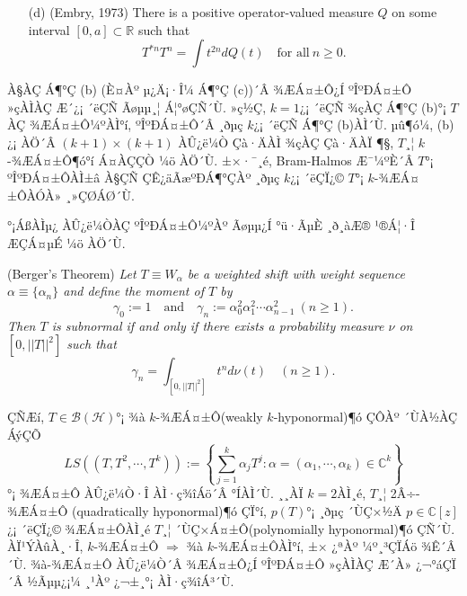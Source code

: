\documentclass[12pt,a4paper,2sided]{article}
\newcommand{\vs}{\vspace}
\begin{document}
\newpage

 \vspace{.4 cm}

{\sl \begin{itemize}
\item[\rm(d)] {\rm (Embry, 1973)}  There is a positive
operator-valued measure $Q$ on some interval $[0,a]\subset
\mathbb{R}$ such that
$$
T^{*n}T^n=\int t^{2n} dQ(t)\quad\text{for all}\ n\ge 0.
$$
\end{itemize}}

À§ÀÇ Á¶°Ç (b) (È¤Àº µ¿Ä¡·Î¼­ Á¶°Ç (c))´Â ¾ÆÁ¤±Ô¿Í ºÎºÐÁ¤±Ô »çÀÌÀÇ
Æ´¿¡ ´ëÇÑ Ãøµµ¸¦ Á¦°øÇÑ´Ù. »ç½Ç, $k=1$¿¡ ´ëÇÑ ¾çÀÇ Á¶°Ç (b)°¡ $T$ÀÇ
¾ÆÁ¤±Ô¼ºÀÌ°í, ºÎºÐÁ¤±Ô´Â ¸ðµç $k$¿¡ ´ëÇÑ Á¶°Ç (b)ÀÌ´Ù. µû¶ó¼­, (b)¿¡
ÀÖ´Â $(k+1)\times (k+1)$ ÀÛ¿ë¼Ò Çà·ÄÀÌ ¾çÀÇ Çà·ÄÀÏ ¶§, $T$¸¦
$k$-¾ÆÁ¤±Ô¶ó°í Á¤ÀÇÇÒ ¼ö ÀÖ´Ù. ±×·¯¸é, Bram-Halmos Æ¯¼ºÈ­´Â $T$°¡
ºÎºÐÁ¤±ÔÀÌ±â À§ÇÑ ÇÊ¿äÃæºÐÁ¶°ÇÀº ¸ðµç $k$¿¡ ´ëÇÏ¿© $T$°¡
$k$-¾ÆÁ¤±ÔÀÓÀ» ¸»ÇØÁØ´Ù.

°¡ÁßÀÌµ¿ ÀÛ¿ë¼ÒÀÇ ºÎºÐÁ¤±Ô¼ºÀº Ãøµµ¿Í °ü·ÃµÈ ¸ð¸àÆ® ¹®Á¦·Î ÆÇÁ¤µÉ ¼ö ÀÖ´Ù.

\vs{0.2cm}{\bf Proposition 2.0.2.} {\rm (Berger's
Theorem)}\label{thm3.6} {\sl Let $T\equiv W_\alpha$ be a weighted
shift with weight sequence $\alpha\equiv\{\alpha_n\}$ and define the
moment of $T$ by
$$
\gamma_0:=1\quad\text{and}\quad \gamma_n:=\alpha_0^2\alpha_1^2\cdots \alpha_{n-1}^2\ (n\ge 1).
$$
Then $T$ is subnormal if and only if there exists a probability
measure $\nu$ on $[0,||T||^2]$ such that}
\begin{equation}\label{2.0.1}
\gamma_n=\int_{[0,||T||^2]} t^{n} d\nu(t)\quad (n\ge 1).
\end{equation}

\vs{0.2cm} ÇÑÆí,  $T\in\mathcal{B(H)}$°¡ {¾à $k$-¾ÆÁ¤±Ô}(weakly
$k$-hyponormal)¶ó ÇÔÀº ´ÙÀ½ÀÇ ÁýÇÕ
$$
LS((T,T^2,\cdots,T^k)):=\left\{\sum_{j=1}^k \alpha_jT^j: \alpha=
(\alpha_1,\cdots,\alpha_k)\in {\mathbb C}^k\right\}
$$
°¡ ¾ÆÁ¤±Ô ÀÛ¿ë¼Ò·Î ÀÌ·ç¾îÁö´Â °ÍÀÌ´Ù. ¸¸ÀÏ $k=2$ÀÌ¸é, $T$¸¦
2Â÷-¾ÆÁ¤±Ô (quadratically hyponormal)¶ó ÇÏ°í, $p(T)$°¡ ¸ðµç ´ÙÇ×½Ä
$p\in{\mathbb C}[z]$¿¡ ´ëÇÏ¿© ¾ÆÁ¤±ÔÀÌ¸é $T$¸¦ ´ÙÇ×Á¤±Ô(polynomially
hyponormal)¶ó ÇÑ´Ù. ÀÏ¹ÝÀûÀ¸·Î, $k$-¾ÆÁ¤±Ô $\Rightarrow$ ¾à
$k$-¾ÆÁ¤±ÔÀÌ°í, ±× ¿ªÀº ¼º¸³ÇÏÁö ¾Ê´Â´Ù. ¾à-¾ÆÁ¤±Ô ÀÛ¿ë¼Ò´Â ¾ÆÁ¤±Ô¿Í
ºÎºÐÁ¤±Ô »çÀÌÀÇ Æ´À» ¿¬°áÇÏ´Â ½Ãµµ¿¡¼­ ¸¹Àº ¿¬±¸°¡ ÀÌ·ç¾îÁ³´Ù.

\newpage{}
\end{document}
